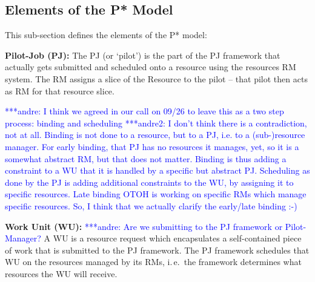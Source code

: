 \documentclass[conference,final]{IEEEtran}
\newcommand{\jhanote}[1]{ {\textcolor{red} { ***shantenu: #1 }}}
\newcommand{\alnote}[1]{ {\textcolor{blue} { ***andre: #1 }}}
\newcommand{\amnote}[1]{ {\textcolor{blue} { ***andre2: #1 }}}
\newcommand{\alnote}[1]{}
\newcommand{\amnote}[1]{}
\newcommand{\jhanote}[1]{}
\newcommand{\upp}{\vspace*{-0.5em}}
\begin{document}
\subsection{Elements of the P* Model \upp\upp}
\noindent This sub-section defines the elements of the P* model:

\begin{compactitem}

\item \textbf{Pilot-Job (PJ):} The PJ (or `pilot') is
  the part of the PJ framework that actually gets submitted and 
  scheduled onto a resource using the resources RM system.  The 
  RM assigns a slice of the Resource to the pilot -- that pilot 
  then acts as RM for that resource slice.  

\alnote{I think we agreed in our call on 09/26 to leave this as a two step
process: binding and scheduling}
\amnote{I don't think there is a contradiction, not at all.  Binding
is not done to a resource, but to a PJ, i.e. to a (sub-)resource manager.  
For early binding, that PJ has no resources it manages, yet, so it is
a somewhat abstract RM, but that does not matter. Binding is thus
adding a constraint to a WU that it is handled by a specific but
abstract PJ.  Scheduling as done by the PJ is adding additional
constraints to the WU, by assigning it to specific resources.  Late
binding OTOH is working on specific RMs which manage specific
resources.  So, I think that we actually clarify the early/late
binding :-)}


\item \textbf{Work Unit (WU):} \alnote{Are we submitting to the PJ framework
or Pilot-Manager?} A WU is a resource request which encapsulates a
self-contained piece of work that is submitted to the PJ framework.
 The PJ framework schedules that WU on the resources managed by its RMs, 
 i.\,e.\ the framework determines what resources the WU will receive.  


\end{compactitem}
\end{document}
